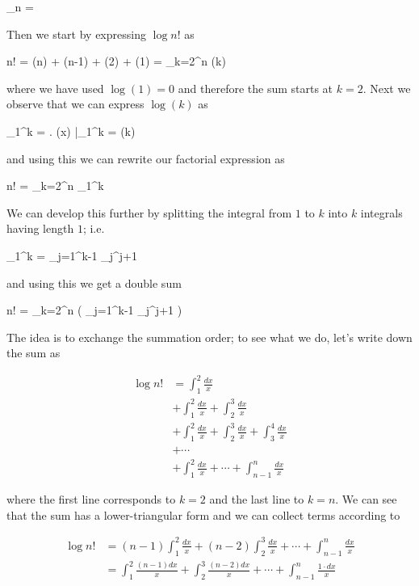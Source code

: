\bee
\lim_{n \rightarrow \infty}  = \sqrt{2\pi}
\eee

Then we start by expressing $\log n!$ as

\bee
\log n! = \log(n) + \log(n-1) + \cdots \log(2) + \log(1) = \sum_{k=2}^n \log(k)
\eee

where we have used $\log(1) = 0$ and therefore the sum starts at $k=2$. Next we observe that we can express $\log(k)$ as

\bee
\int_1^k  = \left. \log(x) \right|_1^k = \log(k)
\eee

and using this we can rewrite our factorial expression as

\bee
\log n! = \sum_{k=2}^n \int_1^k 
\eee

We can develop this further by splitting the integral from $1$ to $k$ into $k$ integrals having length $1$; i.e.

\bee
\int_1^k  = \sum_{j=1}^{k-1} \int_{j}^{j+1} 
\eee

and using this we get a double sum

\bee
\log n! = \sum_{k=2}^n \left( \sum_{j=1}^{k-1} \int_{j}^{j+1}  \right)
\eee

The idea is to exchange the summation order; to see what we do, let's write down the sum as

\begin{align*}
  \log n! &= \int_{1}^{2} \frac{dx}{x} \\
          &+ \int_{1}^{2} \frac{dx}{x}  + \int_{2}^{3} \frac{dx}{x} \\
          &+ \int_{1}^{2} \frac{dx}{x}  + \int_{2}^{3} \frac{dx}{x} + \int_{3}^{4} \frac{dx}{x}\\
          &+ \cdots \\
          &+ \int_{1}^{2} \frac{dx}{x} + \cdots + \int_{n-1}^{n} \frac{dx}{x}
\end{align*}

where the first line corresponds to $k=2$ and the last line to $k=n$. We can see that the sum has a lower-triangular form and we can collect terms according to

\begin{align*}
  \log n! &= (n-1) \int_{1}^{2} \frac{dx}{x} + (n-2) \int_{2}^{3} \frac{dx}{x} + \cdots + \int_{n-1}^{n} \frac{dx}{x} \\
          &= \int_{1}^{2} \frac{(n-1) dx}{x} + \int_{2}^{3} \frac{(n-2) dx}{x} + \cdots + \int_{n-1}^{n} \frac{1 \cdot dx}{x}
\end{align*}

